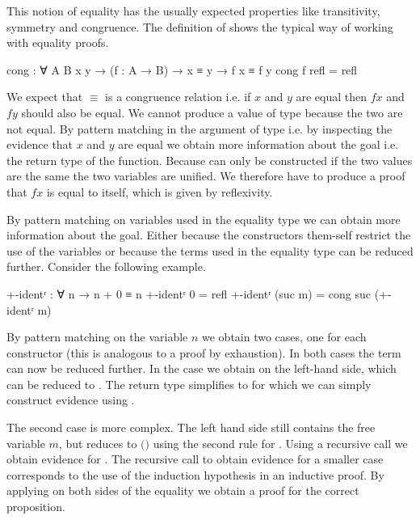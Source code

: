 This notion of equality has the usually expected properties like transitivity,
symmetry and congruence.
The definition of  shows the typical way of working with
equality proofs.

\begin{code}
cong : ∀ {A B x y} → (f : A → B) → x ≡ y → f x ≡ f y
cong f refl = refl
\end{code}
We expect that $≡$ is a congruence relation i.e. if $x$ and $y$ are equal then
$f x$ and $f y$ should also be equal.
We cannot produce a value of type
\AgdaSpace{}\AgdaSpace{}\AgdaSpace{}\AgdaSpace{}
because the two are not equal.
By pattern matching in the argument of type 
\AgdaSpace{}\AgdaSpace{}
i.e. by inspecting the evidence that $x$ and $y$ are equal we obtain more
information about the goal i.e. the return type of the function.
Because  can only be constructed if the two
values are the same the two variables are unified.
We therefore have to produce a proof that $f x$ is equal to itself, which is
given by reflexivity.

By pattern matching on variables used in the equality type we can obtain more
information about the goal.
Either because the constructors them-self restrict the use of the variables or
because the terms used in the equality type can be reduced further.
Consider the following example.

\begin{code}
+-identʳ : ∀ n → n + 0 ≡ n
+-identʳ 0        = refl
+-identʳ (suc m)  = cong suc (+-identʳ m)
\end{code}
By pattern matching on the variable $n$ we obtain two cases, one for each
constructor (this is analogous to a proof by exhaustion).
In both cases the term
\AgdaSpace{}\AgdaFunction{}\AgdaSpace{}
can now be reduced further.
In the  case we obtain
\AgdaSpace{}\AgdaFunction{+}\AgdaSpace{}
on the left-hand side, which can be reduced to .
The return type simplifies to 
\AgdaSpace{}\AgdaSpace{}
for which we can simply construct evidence using
.

The second case is more complex.
The left hand side still contains the free variable $m$, but reduces to
\AgdaSpace{}$($\AgdaSpace{}\AgdaFunction{+}\AgdaSpace{}$)$
using the second rule for \AgdaFunction{\_+\_}.
Using a recursive call we obtain evidence for
\AgdaSpace{}\AgdaFunction{+}\AgdaSpace{}\AgdaSpace{}\AgdaSpace{}.
The recursive call to obtain evidence for a smaller case corresponds to the use
of the induction hypothesis in an inductive proof.
By applying  on both sides of the equality we
obtain a proof for the correct proposition.

